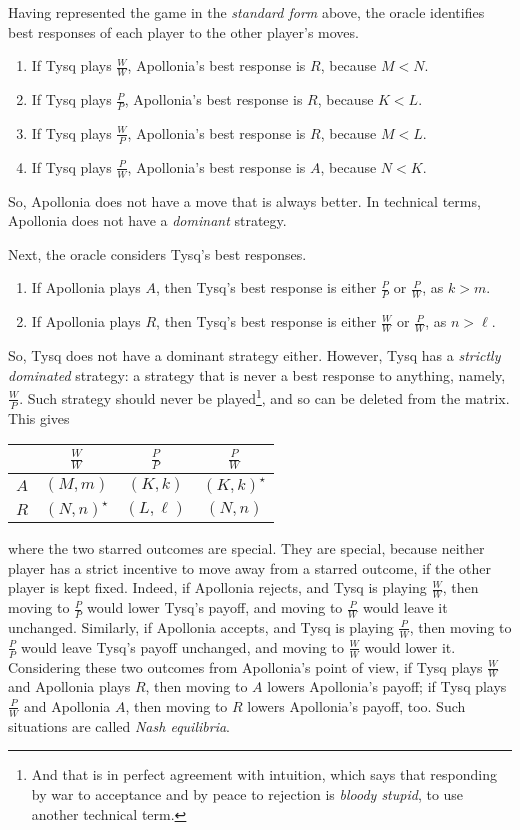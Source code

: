 \documentclass{amsart}
\begin{document}
\bigskip
Having represented the game in the \emph{standard form} above, the oracle 
identifies best responses of each player to the other player's moves. 
\begin{enumerate}
\item If Tysq plays $\frac{W}{W}$, Apollonia's best response is 
$R$, because $M<N$.
\item If Tysq plays $\frac{P}{P}$, Apollonia's best response is
$R$, because $K<L$.
\item If Tysq plays $\frac{W}{P}$, Apollonia's best response is 
$R$, because $M<L$.
\item If Tysq plays $\frac{P}{W}$, Apollonia's best response is
$A$, because $N<K$.
\end{enumerate}
So, Apollonia does not have a move that is always better. In technical terms, 
Apollonia does not have a \emph{dominant} strategy. 

Next, the oracle considers Tysq's best responses.
\begin{enumerate}
\item If Apollonia plays $A$, then Tysq's best response is either 
$\frac{P}{P}$ or $\frac{P}{W}$, as $k>m$.
\item If Apollonia plays $R$, then Tysq's best response is either 
$\frac{W}{W}$ or $\frac{P}{W}$, as $n>\ell$.
\end{enumerate}
So, Tysq does not have a dominant strategy either. However, Tysq has
a \emph{strictly dominated} strategy: a strategy that is never a best response
to anything, namely, $\frac{W}{P}$. Such strategy should never be 
played\footnote{And that is in perfect agreement with intuition, which says
that responding by war to acceptance and by peace to rejection is 
\emph{bloody stupid}, to use another technical term.}, and 
so can be deleted from the matrix. This gives
\begin{center}
\begin{tabular}{c|ccc}
  & $\frac{W}{W}$  & $\frac{P}{P}$  & $\frac{P}{W}$ \\
\hline
$A$ & $(M,m)$      & $(K,k)$        & $(K,k)^\star$  \\
$R$ & $(N,n)^\star$ & $(L,\ell)$     & $(N,n)$  
\end{tabular}
\end{center}
where the two starred outcomes are special. They are special, because
neither player has a strict incentive to move away from a starred outcome, 
if the other player is kept fixed. Indeed, if Apollonia rejects, and Tysq is
playing $\frac{W}{W}$, then moving to $\frac{P}{P}$ would lower Tysq's payoff,
and moving to $\frac{P}{W}$ would leave it unchanged. Similarly,
if Apollonia accepts, and Tysq is playing $\frac{P}{W}$, then
moving to $\frac{P}{P}$ would leave Tysq's payoff unchanged, and 
moving to $\frac{W}{W}$ would lower it. Considering these two outcomes from
Apollonia's point of view, if Tysq plays $\frac{W}{W}$ and Apollonia plays $R$,
then moving to $A$ lowers Apollonia's payoff; if Tysq plays
$\frac{P}{W}$ and Apollonia $A$, then moving to $R$ lowers Apollonia's payoff,
too. Such situations are called \emph{Nash equilibria}. 
\end{document}
